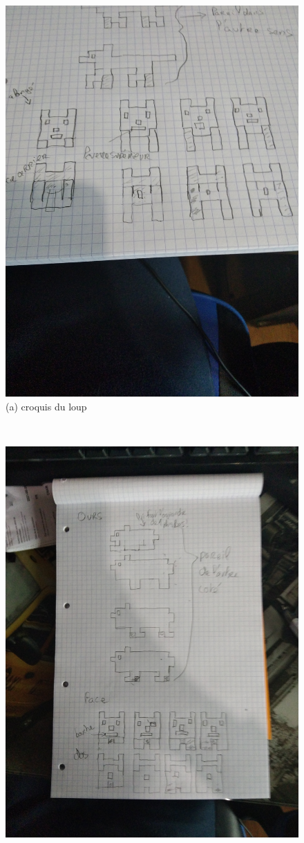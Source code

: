 \documentclass[a4paper, 11pt]{article}
\begin{document}
\begin{enumerate}
\begin{figure}[ht!]
\begin{minipage}[c]{.5\linewidth}
   \includegraphics[width=\linewidth]{images/loup2.jpg}
  \end{minipage}
  \caption{(a) croquis du loup}
  \label{fig::example::two}
\end{figure}
\\
\begin{figure}[ht!]
 \centering
 \includegraphics[width=0.5\linewidth]{images/ours.jpg}

\end{figure}
\end{enumerate}
\end{document}
